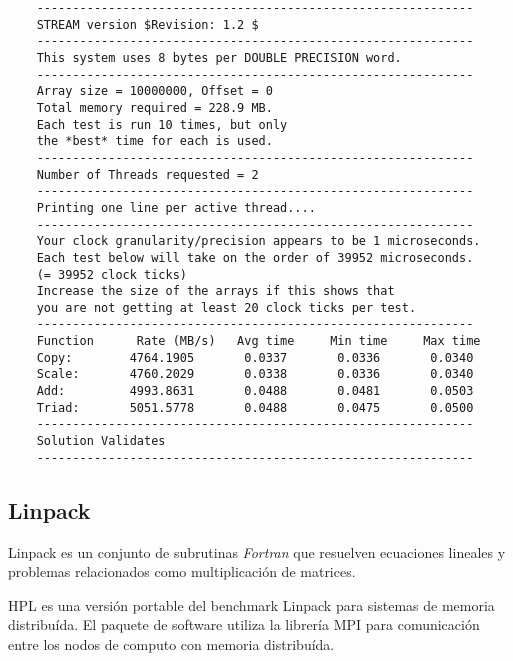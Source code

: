 \documentclass[a4paper]{report}
\begin{document}
\begin{verbatim}
    -------------------------------------------------------------
    STREAM version $Revision: 1.2 $
    -------------------------------------------------------------
    This system uses 8 bytes per DOUBLE PRECISION word.
    -------------------------------------------------------------
    Array size = 10000000, Offset = 0
    Total memory required = 228.9 MB.
    Each test is run 10 times, but only
    the *best* time for each is used.
    -------------------------------------------------------------
    Number of Threads requested = 2
    -------------------------------------------------------------
    Printing one line per active thread....
    -------------------------------------------------------------
    Your clock granularity/precision appears to be 1 microseconds.
    Each test below will take on the order of 39952 microseconds.
    (= 39952 clock ticks)
    Increase the size of the arrays if this shows that
    you are not getting at least 20 clock ticks per test.
    -------------------------------------------------------------
    Function      Rate (MB/s)   Avg time     Min time     Max time
    Copy:        4764.1905       0.0337       0.0336       0.0340
    Scale:       4760.2029       0.0338       0.0336       0.0340
    Add:         4993.8631       0.0488       0.0481       0.0503
    Triad:       5051.5778       0.0488       0.0475       0.0500
    -------------------------------------------------------------
    Solution Validates
    -------------------------------------------------------------
\end{verbatim}

\subsection{Linpack}

\cite{linpack}

Linpack es un conjunto de subrutinas {\it Fortran} que resuelven ecuaciones lineales y problemas relacionados como
multiplicaci\'on de matrices.

\cite{hpl}

HPL es una versi\'on portable del benchmark Linpack para sistemas de memoria distribu\'ida. El paquete de software
utiliza la librer\'ia MPI para comunicaci\'on entre los nodos de computo con memoria distribu\'ida.
\end{document}
